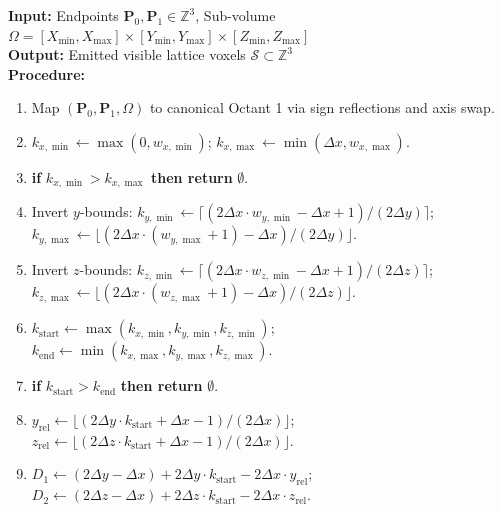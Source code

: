 \documentclass[conference]{IEEEtran}
\begin{document}
\begin{algorithm}[t]
\caption{3D AP-Bresenham Voxel Ray Traversal}
\label{alg:ap_bresenham}
\begin{footnotesize}
\textbf{Input:} Endpoints $\mathbf{P}_0, \mathbf{P}_1 \in \mathbb{Z}^3$, Sub-volume $\Omega = [X_{\min}, X_{\max}] \times [Y_{\min}, Y_{\max}] \times [Z_{\min}, Z_{\max}]$\\
\textbf{Output:} Emitted visible lattice voxels $\mathcal{S} \subset \mathbb{Z}^3$\\
\textbf{Procedure:}
\begin{enumerate}
    \item Map $(\mathbf{P}_0, \mathbf{P}_1, \Omega)$ to canonical Octant 1 via sign reflections and axis swap.
    \item $k_{x,\min} \leftarrow \max(0, w_{x,\min})$; \quad $k_{x,\max} \leftarrow \min(\Delta x, w_{x,\max})$.
    \item \textbf{if} $k_{x,\min} > k_{x,\max}$ \textbf{then return} $\emptyset$.
    \item Invert $y$-bounds: $k_{y,\min} \leftarrow \lceil (2\Delta x \cdot w_{y,\min} - \Delta x + 1) / (2\Delta y) \rceil$; \\
          $k_{y,\max} \leftarrow \lfloor (2\Delta x \cdot (w_{y,\max} + 1) - \Delta x) / (2\Delta y) \rfloor$.
    \item Invert $z$-bounds: $k_{z,\min} \leftarrow \lceil (2\Delta x \cdot w_{z,\min} - \Delta x + 1) / (2\Delta z) \rceil$; \\
          $k_{z,\max} \leftarrow \lfloor (2\Delta x \cdot (w_{z,\max} + 1) - \Delta x) / (2\Delta z) \rfloor$.
    \item $k_{\mathrm{start}} \leftarrow \max(k_{x,\min}, k_{y,\min}, k_{z,\min})$; $k_{\mathrm{end}} \leftarrow \min(k_{x,\max}, k_{y,\max}, k_{z,\max})$.
    \item \textbf{if} $k_{\mathrm{start}} > k_{\mathrm{end}}$ \textbf{then return} $\emptyset$.
    \item $y_{\mathrm{rel}} \leftarrow \lfloor (2\Delta y \cdot k_{\mathrm{start}} + \Delta x - 1) / (2\Delta x) \rfloor$; \\
          $z_{\mathrm{rel}} \leftarrow \lfloor (2\Delta z \cdot k_{\mathrm{start}} + \Delta x - 1) / (2\Delta x) \rfloor$.
    \item $D_1 \leftarrow (2\Delta y - \Delta x) + 2\Delta y \cdot k_{\mathrm{start}} - 2\Delta x \cdot y_{\mathrm{rel}}$; \\
          $D_2 \leftarrow (2\Delta z - \Delta x) + 2\Delta z \cdot k_{\mathrm{start}} - 2\Delta x \cdot z_{\mathrm{rel}}$.

\end{enumerate}
\end{footnotesize}
\end{algorithm}
\end{document}
